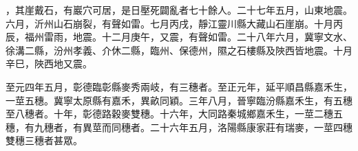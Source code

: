 \begin{pinyinscope}
，其崖戴石，有巖穴可居，是日壓死闢亂者七十餘人。二十七年五月，山東地震。六月，沂州山石崩裂，有聲如雷。七月丙戌，靜江靈川縣大藏山石崖崩。十月丙辰，福州雷雨，地震。十二月庚午，又震，有聲如雷。二十八年六月，冀寧文水、徐溝二縣，汾州孝義、介休二縣，臨州、保德州，隰之石樓縣及陜西皆地震。十月辛巳，陜西地又震。



 至元四年五月，彰德臨彰縣麥秀兩岐，有三穗者。至正元年，延平順昌縣嘉禾生，一莖五穗。冀寧太原縣有嘉禾，異畝同穎。三年八月，晉寧臨汾縣嘉禾生，有五穗至八穗者。十年，彰德路穀麥雙穗。十六年，大同路秦城鄉嘉禾生，一莖二穗五穗，有九穗者，有異莖而同穗者。二十六年五月，洛陽縣康家莊有瑞麥，一莖四穗雙穗三穗者甚眾。



\end{pinyinscope}